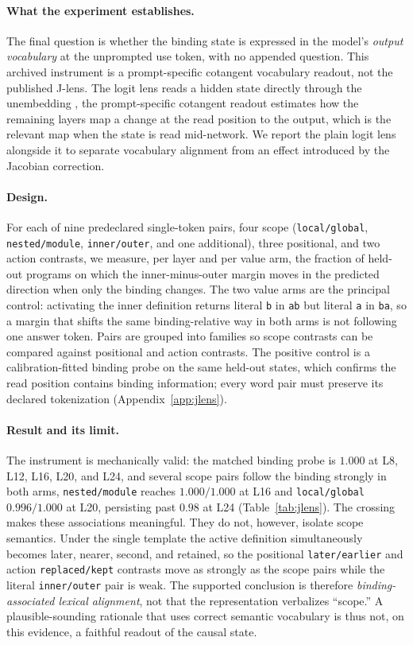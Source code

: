 \documentclass[10pt]{article}
\newcommand{\code}[1]{\texttt{#1}}
\begin{document}
\paragraph{What the experiment establishes.} The final question is whether the
binding state is expressed in the model's \emph{output vocabulary} at the
unprompted use token, with no appended question. This archived instrument is a
prompt-specific cotangent vocabulary readout, not the published J-lens. The logit lens
reads a hidden state directly through the unembedding
\citep{nostalgebraist2020logitlens}, the prompt-specific cotangent readout estimates how the remaining layers
map a change at the read position to the output, which is the relevant map when
the state is read mid-network. We report the plain logit lens alongside it to
separate vocabulary alignment from an effect introduced by the Jacobian
correction.

\paragraph{Design.} For each of nine predeclared single-token pairs, four scope
(\code{local/global}, \code{nested/module}, \code{inner/outer}, and one
additional), three positional, and two action contrasts, we measure, per layer
and per value arm, the fraction of held-out programs on which the
inner-minus-outer margin moves in the predicted direction when only the binding
changes. The two value arms are the principal control: activating the inner
definition returns literal \code{b} in \code{ab} but literal \code{a} in
\code{ba}, so a margin that shifts the same binding-relative way in both arms is
not following one answer token. Pairs are grouped into families so scope
contrasts can be compared against positional and action contrasts. The positive
control is a calibration-fitted binding probe on the same held-out states, which
confirms the read position contains binding information; every word pair must
preserve its declared tokenization (Appendix~\ref{app:jlens}).

\paragraph{Result and its limit.} The instrument is mechanically valid: the
matched binding probe is $1.000$ at L8, L12, L16, L20, and L24, and several scope
pairs follow the binding strongly in both arms, \code{nested/module} reaches
$1.000/1.000$ at L16 and \code{local/global} $0.996/1.000$ at L20, persisting past
$0.98$ at L24 (Table~\ref{tab:jlens}). The crossing makes these associations
meaningful. They do not, however, isolate scope semantics. Under the single
template the active definition simultaneously becomes later, nearer, second, and
retained, so the positional \code{later/earlier} and action \code{replaced/kept}
contrasts move as strongly as the scope pairs while the literal \code{inner/outer}
pair is weak. The supported conclusion is therefore
\emph{binding-associated lexical alignment}, not that the representation
verbalizes ``scope.'' A plausible-sounding rationale that uses correct semantic
vocabulary is thus not, on this evidence, a faithful readout of the causal state.
\end{document}
